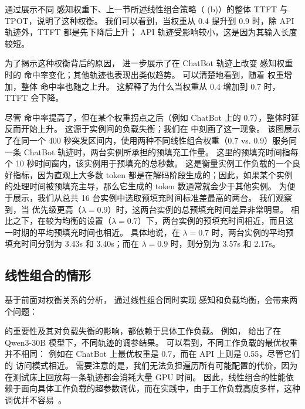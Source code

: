 {} 通过展示不同 {\kvcache} 感知权重下、上一节所述线性组合策略（{} (b)）的整体 TTFT 与 TPOT，说明了这种权衡。
我们可以看到，当权重从 0.4 提升到 0.9 时，除 API 轨迹外，TTFT 都是先下降后上升；
API 轨迹受影响较小，这是因为其输入长度较短。

为了揭示这种权衡背后的原因，
{} 进一步展示了在 ChatBot 轨迹上改变 {\kvcache} 感知权重时的 {\kvcache} 命中率变化；其他轨迹也表现出类似趋势。
可以清楚地看到，随着 {\kvcache} 权重增加，整体 {\kvcache} 命中率也随之上升。
这解释了为什么当权重从 0.4 增加到 0.7 时，TTFT 会下降。

尽管 {\kvcache} 命中率提高了，但在某个权重拐点之后（例如 ChatBot 上的 0.7），整体时延反而开始上升。
这源于实例间的负载失衡；我们在 {} 中刻画了这一现象。
该图展示了在同一个 400 秒突发区间内，使用两种不同线性组合权重（0.7 vs. 0.9）服务同一条 ChatBot 轨迹时，两台实例所承担的预填充工作量。
这里的预填充时间指每个 10 秒时间窗内，该实例用于预填充的总秒数。
这是衡量实例工作负载的一个良好指标，因为直观上大多数 token 都是在解码阶段生成的；因此，如果某个实例的处理时间被预填充主导，那么它生成的 token 数通常就会少于其他实例。
为便于展示，我们从总共 16 台实例中选取预填充时间标准差最高的两台。
我们观察到，当 {\kvcache} 优先级更高（$\lambda=0.9$）时，这两台实例的总预填充时间差异非常明显。
相比之下，在较为均衡的设置（$\lambda=0.7$）下，两台实例的预填充时间相近，而且这一时期的平均预填充时间也相近。
具体地说，在 $\lambda=0.7$ 时，两台实例的平均预填充时间分别为 3.43s 和 3.40s；而在 $\lambda=0.9$ 时，则分别为 3.57s 和 2.17s。



\subsection{线性组合的情形}
\label{sec:linear-combination}

\noindent
基于前面对权衡关系的分析，
通过线性组合同时实现 {\kvcache} 感知和负载均衡，会带来两个问题：

{\kvcache} 的重要性及其对负载失衡的影响，都依赖于具体工作负载。
例如，{} 给出了在 Qwen3-30B 模型下，不同轨迹的调参结果。
可以看到，不同工作负载的最优权重并不相同：
例如在 ChatBot 上最优权重是 0.7，而在 API 上则是 0.55，尽管它们的 {\kvcache} 访问模式相近。
需要注意的是，我们无法负担遍历所有可能配置的代价，因为在测试床上回放每一条轨迹都会消耗大量 GPU 时间。
因此，线性组合的性能依赖于面向具体工作负载的超参数调优，而在实践中，由于工作负载高度多样，这种调优并不容易~\cite{10.5555/3768039.3768067}。


